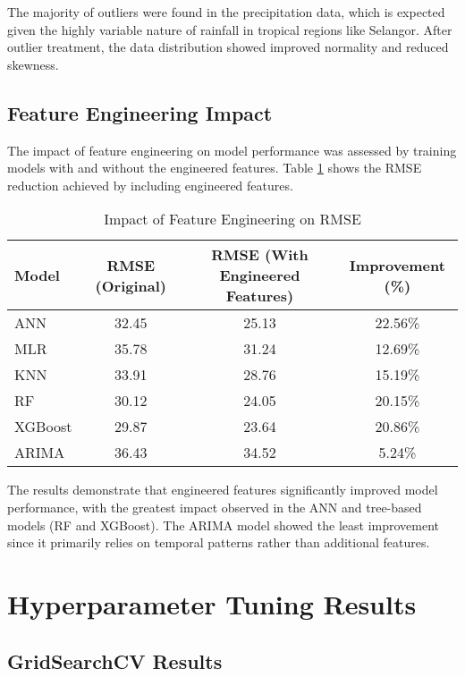 \documentclass[12pt]{article}
\begin{document}
The majority of outliers were found in the precipitation data, which is expected given the highly variable nature of rainfall in tropical regions like Selangor. After outlier treatment, the data distribution showed improved normality and reduced skewness.

\subsection{Feature Engineering Impact}
\label{subsec:feature_engineering_results}

The impact of feature engineering on model performance was assessed by training models with and without the engineered features. Table \ref{tab:feature_engineering_impact} shows the RMSE reduction achieved by including engineered features.

\begin{table}[h]
\centering
\caption{Impact of Feature Engineering on RMSE}
\label{tab:feature_engineering_impact}
\begin{tabular}{|l|c|c|c|}
\hline
\textbf{Model} & \textbf{RMSE (Original)} & \textbf{RMSE (With Engineered Features)} & \textbf{Improvement (\%)} \\
\hline
ANN & 32.45 & 25.13 & 22.56\% \\
\hline
MLR & 35.78 & 31.24 & 12.69\% \\
\hline
KNN & 33.91 & 28.76 & 15.19\% \\
\hline
RF & 30.12 & 24.05 & 20.15\% \\
\hline
XGBoost & 29.87 & 23.64 & 20.86\% \\
\hline
ARIMA & 36.43 & 34.52 & 5.24\% \\
\hline
\end{tabular}
\end{table}

The results demonstrate that engineered features significantly improved model performance, with the greatest impact observed in the ANN and tree-based models (RF and XGBoost). The ARIMA model showed the least improvement since it primarily relies on temporal patterns rather than additional features.

\section{Hyperparameter Tuning Results}
\label{sec:tuning_results}

\subsection{GridSearchCV Results}
\label{subsec:gridsearchcv_results}
\end{document}
